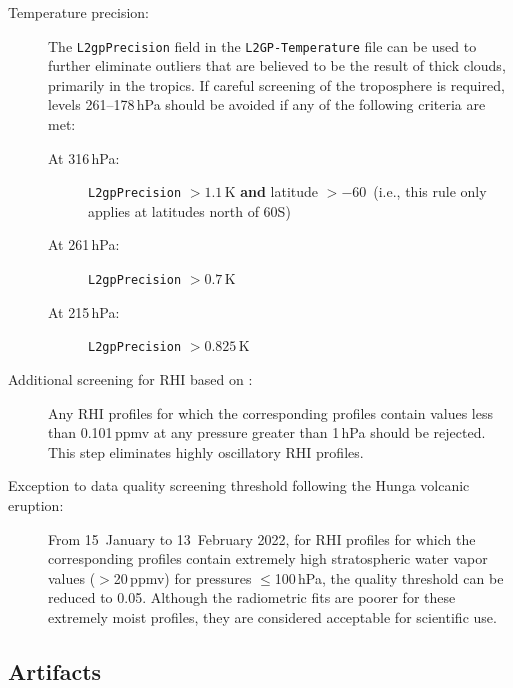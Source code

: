 \begin{nofloatpages}
\begin{description}
  \item[Temperature precision:] The \texttt{L2gpPrecision} field in the \texttt{L2GP-Temperature} file can be used to further eliminate outliers that are believed to be the result of thick clouds, primarily in the tropics. If careful screening of the troposphere is required, levels 261--178\,hPa should be avoided if any of the following criteria are met:
    \begin{description}
      \item[At 316\,hPa:] \texttt{L2gpPrecision} $>1.1$\,K \textbf{and} latitude $> -60$\degsym\ (i.e., this rule only applies at latitudes north of 60\degsym{}S)
      \item[At 261\,hPa:] \texttt{L2gpPrecision} $>0.7$\,K
      \item[At 215\,hPa:] \texttt{L2gpPrecision} $>0.825$\,K
    \end{description}

  \item[Additional screening for RHI based on :] Any RHI profiles for which the corresponding  profiles contain values less than 0.101\,ppmv at any pressure greater than 1\,hPa should be rejected.  This step eliminates highly oscillatory RHI profiles.
  \item[Exception to data quality screening threshold following the Hunga volcanic eruption:] From 15~January to 13~February 2022, for RHI profiles for which the corresponding  profiles contain extremely high stratospheric water vapor values ($>$20\,ppmv) for pressures $\le$100\,hPa, the quality threshold can be reduced to 0.05. Although the radiometric fits are poorer for these extremely moist profiles, they are considered acceptable for scientific use.
\end{description}
\end{nofloatpages}

\subsection{Artifacts}
\label{sec:RHIartifacts}


